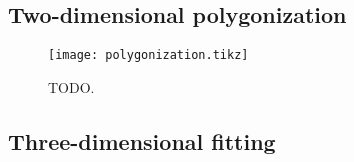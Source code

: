 \subsection{Two-dimensional polygonization}

\begin{figure}[H]
  \centering
  \texttt{[image: polygonization.tikz]}
  \caption{TODO.}
\end{figure}

\subsection{Three-dimensional fitting}
